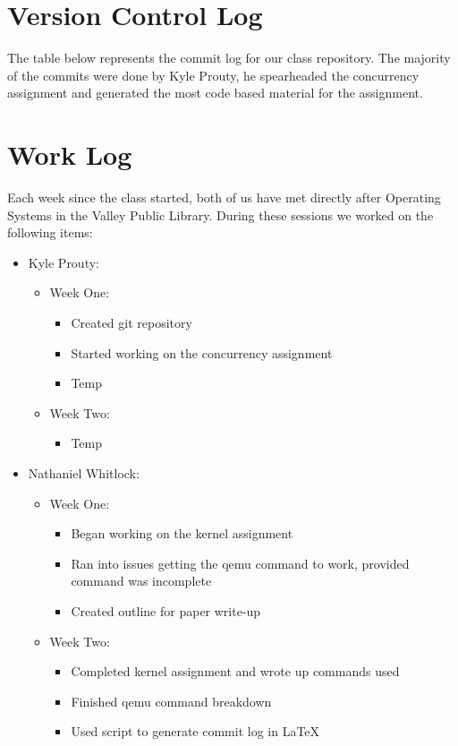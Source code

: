 \documentclass[a4paper]{article}
\begin{document}
\section{Version Control Log}
The table below represents the commit log for our class repository. The majority of the commits were done by Kyle Prouty, he spearheaded the concurrency assignment and generated the most code based material for the assignment. \\





\section{Work Log}
Each week since the class started, both of us have met directly after Operating Systems in the Valley Public Library. During these sessions we worked on the following items:
\begin{itemize}
  \item Kyle Prouty: 
    \begin{itemize}
          \item Week One:
          \begin{itemize}
              \item Created git repository
              \item Started working on the concurrency assignment
              \item Temp
          \end{itemize}
          \item Week Two:
          \begin{itemize}
              \item Temp
          \end{itemize}
        \end{itemize}
    \item Nathaniel Whitlock:
    \begin{itemize}
      \item Week One:
        \begin{itemize}
          \item Began working on the kernel assignment
            \item Ran into issues getting the qemu command to work, provided command was incomplete
            \item Created outline for paper write-up
        \end{itemize}
        \item Week Two:
        \begin{itemize}
          \item Completed kernel assignment and wrote up commands used
            \item Finished qemu command breakdown
            \item Used script to generate commit log in \LaTeX
        \end{itemize}
    \end{itemize}
\end{itemize}
\end{document}
